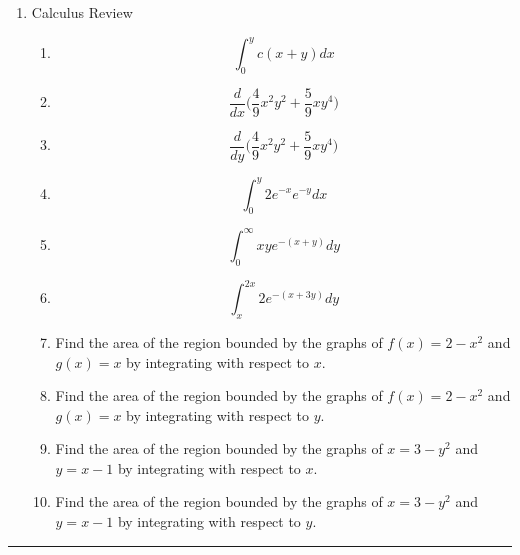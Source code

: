 \documentclass[12pt]{article}
\begin{document}
\begin{enumerate}

\item \label{CalculusReview} Calculus Review %


\begin{enumerate}
\item $$\int_0^yc(x+y)dx$$
\item $$\frac{d}{dx}\bigg(\frac{4}{9}x^2y^2+\frac{5}{9}xy^4\bigg) $$
\item $$\frac{d}{dy}\bigg(\frac{4}{9}x^2y^2+\frac{5}{9}xy^4\bigg) $$

\item $$\int_0^y2e^{-x}e^{-y}dx$$
\item $$\int_0^\infty xye^{-(x+y)}dy$$
\item $$\int_x^{2x} 2e^{-(x+3y)}dy$$

\item Find the area of the region bounded by the graphs of $f(x)=2-x^2$ and $g(x)=x$ by integrating with respect to $x$.
\item Find the area of the region bounded by the graphs of $f(x)=2-x^2$ and $g(x)=x$ by integrating with respect to $y$.

\item Find the area of the region bounded by the graphs of $x=3-y^2$ and $y=x-1$ by integrating with respect to $x$.
\item Find the area of the region bounded by the graphs of $x=3-y^2$ and $y=x-1$ by integrating with respect to $y$.
\end{enumerate}








\end{enumerate}  %



\rule{500pt}{1pt}
\bigskip
\end{document}

